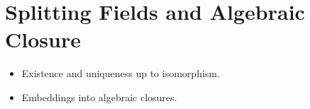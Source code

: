 \section{Splitting Fields and Algebraic Closure}
\begin{itemize}
  \item Existence and uniqueness up to isomorphism.
  \item Embeddings into algebraic closures.
\end{itemize}
